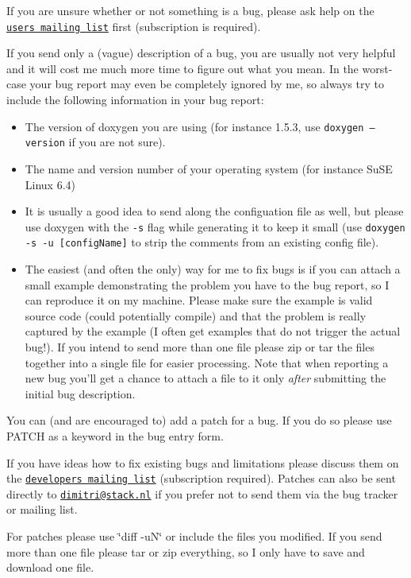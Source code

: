 If you are unsure whether or not something is a bug, please ask help on the \href{http://sourceforge.net/mail/?group_id=5971}{\tt users mailing list} first (subscription is required).

If you send only a (vague) description of a bug, you are usually not very helpful and it will cost me much more time to figure out what you mean. In the worst-case your bug report may even be completely ignored by me, so always try to include the following information in your bug report:\begin{itemize}
\item The version of doxygen you are using (for instance 1.5.3, use {\tt doxygen --version} if you are not sure).\item The name and version number of your operating system (for instance SuSE Linux 6.4)\item It is usually a good idea to send along the configuation file as well, but please use doxygen with the {\tt -s} flag while generating it to keep it small (use {\tt doxygen -s -u \mbox{[}configName\mbox{]}} to strip the comments from an existing config file).\item The easiest (and often the only) way for me to fix bugs is if you can attach a small example demonstrating the problem you have to the bug report, so I can reproduce it on my machine. Please make sure the example is valid source code (could potentially compile) and that the problem is really captured by the example (I often get examples that do not trigger the actual bug!). If you intend to send more than one file please zip or tar the files together into a single file for easier processing. Note that when reporting a new bug you'll get a chance to attach a file to it only {\em after\/} submitting the initial bug description.\end{itemize}


You can (and are encouraged to) add a patch for a bug. If you do so please use PATCH as a keyword in the bug entry form.

If you have ideas how to fix existing bugs and limitations please discuss them on the \href{http://sourceforge.net/mail/?group_id=5971}{\tt developers mailing list} (subscription required). Patches can also be sent directly to \href{mailto:dimitri@stack.nl}{\tt dimitri@stack.nl} if you prefer not to send them via the bug tracker or mailing list.

For patches please use \char`\"{}diff -uN\char`\"{} or include the files you modified. If you send more than one file please tar or zip everything, so I only have to save and download one file.

 